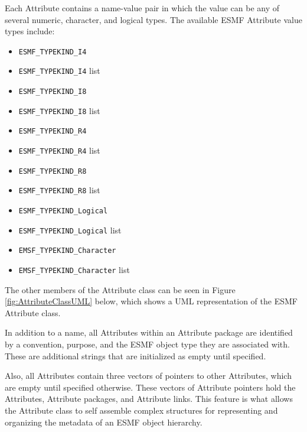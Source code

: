 %

Each Attribute contains a name-value pair in which the value can be any of several numeric, character, and logical types.  The available ESMF Attribute value types include:

\label{table:attTypes}
\begin{itemize}
\item {\tt ESMF\_TYPEKIND\_I4}
\item {\tt ESMF\_TYPEKIND\_I4} list
\item {\tt ESMF\_TYPEKIND\_I8}
\item {\tt ESMF\_TYPEKIND\_I8} list
\item {\tt ESMF\_TYPEKIND\_R4}
\item {\tt ESMF\_TYPEKIND\_R4} list
\item {\tt ESMF\_TYPEKIND\_R8}
\item {\tt ESMF\_TYPEKIND\_R8} list
\item {\tt ESMF\_TYPEKIND\_Logical}
\item {\tt ESMF\_TYPEKIND\_Logical} list
\item {\tt EMSF\_TYPEKIND\_Character}
\item {\tt EMSF\_TYPEKIND\_Character} list
\end{itemize}

The other members of the Attribute class can be seen in Figure \ref{fig:AttributeClassUML}  below, which shows a UML representation of the ESMF Attribute class.

In addition to a name, all Attributes within an Attribute package are identified by a convention, purpose, and the ESMF object type they are associated with. These are additional strings that are initialized as empty until specified. 

Also, all Attributes contain three vectors of pointers to other Attributes, which are empty until specified otherwise.  These vectors of Attribute pointers hold the Attributes, Attribute packages, and Attribute links.  This feature is what allows the Attribute class to self assemble complex structures for representing and organizing the metadata of an ESMF object hierarchy.

